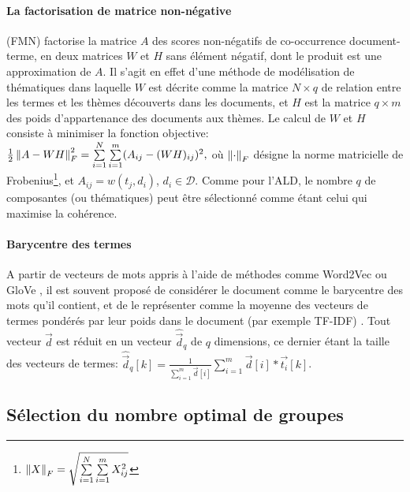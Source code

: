 \paragraph[NMF]{La factorisation de matrice non-négative} (FMN) \citep{paatero1994nmf} factorise la matrice $A$ des scores non-négatifs de co-occurrence document-terme, en deux matrices $W$ et $H$ sans élément négatif, dont le produit est une approximation de $A$. Il s'agit en effet d'une méthode de modélisation de thématiques dans laquelle $W$ est décrite comme la matrice $N\times q$ de relation entre les termes et les thèmes découverts dans les documents, et $H$ est la matrice $q\times m$ des poids d'appartenance des documents aux thèmes. Le calcul de $W$ et $H$ consiste à minimiser la fonction objective: $\frac{1}{2}\left\lVert A - WH\right\rVert^2_F = \sum\limits_{i=1}^N\sum\limits_{i=1}^m (A_{ij} - (WH)_{ij})^2,$ où $\left\lVert\cdot\right\rVert_F$ désigne la norme matricielle de Frobenius\footnote{$\left\lVert X\right\rVert_F = \sqrt{\sum\limits_{i=1}^N\sum\limits_{i=1}^m X_{ij}^2}$}, et $A_{ij} = w(t_j, d_i)$, $d_i \in \mathcal{D}$.  %
Comme pour l'ALD, le nombre $q$ de composantes (ou thématiques) peut être sélectionné comme étant celui qui  maximise la cohérence. 


\paragraph[w2v*TF-IDF]{Barycentre des termes}
A partir de vecteurs de mots appris à l'aide de méthodes comme Word2Vec \citep{mikolov2013word2vec} ou GloVe \citep{pennington2014glove}, il est souvent proposé de considérer le document comme le barycentre des mots qu'il contient, et de le représenter comme la moyenne des vecteurs de termes pondérés par leur poids dans le document (par exemple TF-IDF) \citep{lemikolov2014word2vec, charlet2018simbow_coria,arora2017wordAvgSentEmbedd}. Tout vecteur $\vec{d}$ est réduit en un vecteur $\hat{\vec{d}}_q$ de $q$ dimensions, ce dernier étant la taille des vecteurs de termes: $\hat{\vec{d}}_q[k] = \frac{1}{\sum\limits_{i=1}^m \vec{d}[i]} \sum\limits_{i=1}^{m}\vec{d}[i]*\vec{t_i}[k]$.

\subsection{Sélection du nombre optimal de groupes}
\label{sec:similarite:k-optimal}

